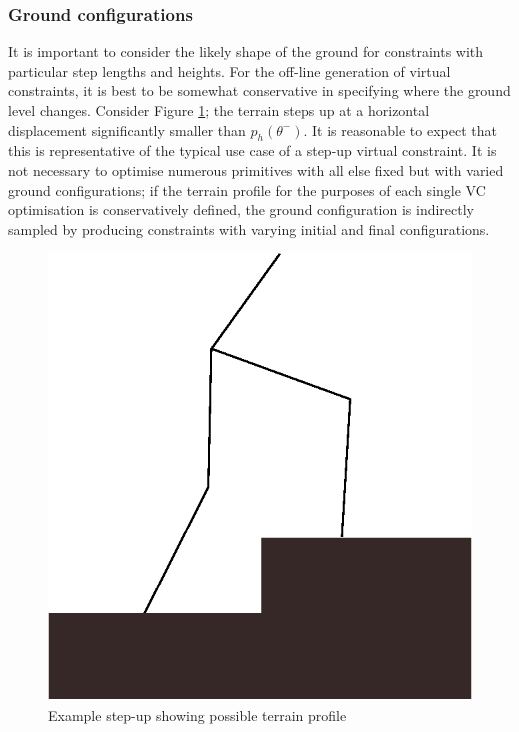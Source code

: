 \subsubsection{Ground configurations} \label{sec:ground}
It is important to consider the likely shape of the ground for constraints with particular step lengths and heights. For the off-line generation of virtual constraints, it is best to be somewhat conservative in specifying where the ground level changes. Consider Figure \ref{fig:stepup}; the terrain steps up at a horizontal displacement significantly smaller than $p_h(\theta^-)$. It is reasonable to expect that this is representative of the typical use case of a step-up virtual constraint. It is not necessary to optimise numerous primitives with all else fixed but with varied ground configurations; if the terrain profile for the purposes of each single VC optimisation is conservatively defined, the ground configuration is indirectly sampled by producing constraints with varying initial and final configurations.

\begin{figure}
	\centering
	\includegraphics[width=0.4\linewidth]{4VirtConstLib/stepup.eps}
	\caption{Example step-up showing possible terrain profile}
	\label{fig:stepup}
\end{figure}

